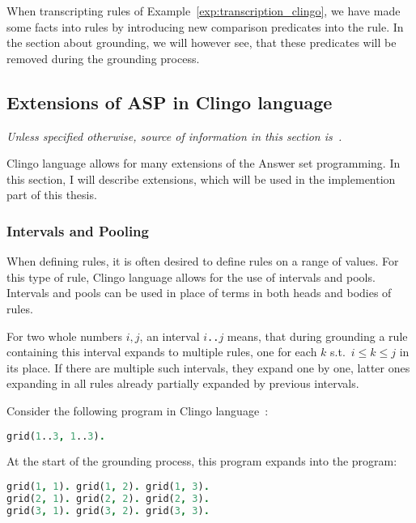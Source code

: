When transcripting rules of Example~\ref{exp:transcription_clingo},
we have made some facts into rules by introducing new comparison predicates into the rule.
In the section about grounding, we will however see, that these predicates will be
removed during the grounding process.

\subsection{Extensions of ASP in Clingo language}

\textit{%
    Unless specified otherwise,
    source of information in this section is~\cite{gebser2019potassco}.}
    \vspace{1em}

Clingo language allows for many extensions of the Answer set programming.
In this section, I will describe extensions, which will be used in the implemention part
of this thesis.


\subsubsection{Intervals and Pooling}

When defining rules, it is often desired to define rules on a range of values.
For this type of rule, Clingo language allows for the use of intervals and pools.
Intervals and pools can be used in place of terms in both heads and bodies of rules.

For two whole numbers $i, j$, an interval \texttt{$i$..$j$} means,
that during grounding a rule containing this interval expands to multiple rules,
one for each $k$ s.t.\ $i \leq k\leq j$ in its place.
If there are multiple such intervals, they expand one by one,
latter ones expanding in all rules already partially expanded by previous intervals.

\begin{example}
    Consider the following program in Clingo language~\cite{gebser2019potassco}:
    \begin{lstlisting}[language=prolog, numbers=none]
grid(1..3, 1..3).
\end{lstlisting}
    At the start of the grounding process, this program expands into the program:
    \begin{lstlisting}[language=prolog, numbers=none]
grid(1, 1). grid(1, 2). grid(1, 3).
grid(2, 1). grid(2, 2). grid(2, 3).
grid(3, 1). grid(3, 2). grid(3, 3).
\end{lstlisting}
\end{example}

